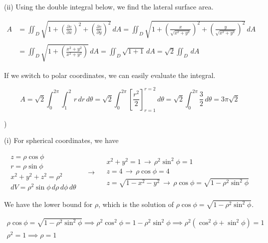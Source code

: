 \documentclass{article}
\begin{document}
\hfill

\noindent (ii) Using the double integral below, we find the lateral surface area.

\begin{align*}
A&=\iint_D\sqrt{1+\left(\frac{\partial z}{\partial x}\right)^2 +\left(\frac{\partial z}{\partial y}\right)^2}\,dA= \iint_D\sqrt{1+\left(\frac{x}{\sqrt{x^2+y^2}}\right)^2 +\left(\frac{y}{\sqrt{x^2+y^2}}\right)^2}\,dA \\\\&=\iint_D\sqrt{1+\left(\frac{x^2+y^2}{x^2+y^2}\right)}\,dA=\iint_D\sqrt{1+1}\,dA=\sqrt{2}\iint_D\,dA
\end{align*}

\hfill

\noindent If we switch to polar coordinates, we can easily evaluate the integral.

\begin{equation*}A=\sqrt2\int_0^{2\pi}\int_1^2\,r\,dr\,d\theta=\sqrt2\int_0^{2\pi}\left[\frac{r^2}2\right]_{r=1}^{r=2}\,d\theta=\sqrt2\int_0^{2\pi}\frac32\,d\theta=\boxed{3\pi\sqrt2}\end{equation*}

\newpage

)

\hfill

\noindent (i) For spherical coordinates, we have

\[
\begin{array}{c}
z=\rho\cos\phi\\
r=\rho\sin\phi\\
x^2+y^2+z^2=\rho^2\\
dV=\rho^2\sin\phi\,d\rho\,d\phi\,d\theta
\end{array}\quad\rightarrow\quad
\begin{array}{c}
x^2+y^2=1\,\rightarrow\,\rho^2\sin^2\phi = 1\\
z=4\,\rightarrow\,\rho\cos\phi=4\\
z=\sqrt{1-x^2-y^2}\,\rightarrow\,\rho\cos\phi=\sqrt{1-\rho^2\sin^2\phi}
\end{array}
\]

\hfill

\noindent We have the lower bound for $\rho$, which is the solution of $\rho\cos\phi=\sqrt{1-\rho^2\sin^2\phi}$.

\[
\begin{array}{c}
\rho\cos\phi=\sqrt{1-\rho^2\sin^2\phi}\implies\rho^2\cos^2\phi=1-\rho^2\sin^2\phi\implies
\rho^2\left(\cos^2\phi+\sin^2\phi\right)=1\\
\rho^2=1\implies\rho=1
\end{array}
\]
\end{document}
